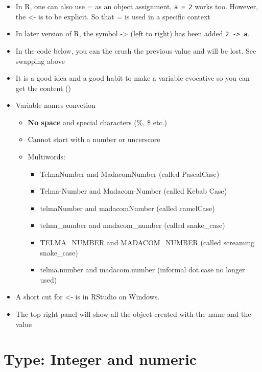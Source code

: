 \documentclass[
  letterpaper,
  DIV=11,
  numbers=noendperiod]{scrreprt}
\providecommand{\tightlist}{%
  \setlength{\itemsep}{0pt}\setlength{\parskip}{0pt}}
\begin{document}
\begin{itemize}
\tightlist
\item
  In R, one can also use = as an object assignment, \texttt{a\ =\ 2}
  works too. However, the \textless- is to be explicit. So that = is
  used in a specific context
\item
  In later version of R, the symbol -\textgreater{} (left to right) has
  been added \texttt{2\ -\textgreater{}\ a}.
\item
  In the code below, you can the crush the previous value and will be
  lost. See swapping above
\item
  It is a good idea and a good habit to make a variable evocative so you
  can get the content ()
\item
  Variable names convetion

  \begin{itemize}
  \tightlist
  \item
    \textbf{No space} and special characters (\%, \$ etc.)
  \item
    Cannot start with a number or uncerscore
  \item
    Multiwords:

    \begin{itemize}
    \tightlist
    \item
      TelmaNumber and MadacomNumber (called PascalCase)
    \item
      Telma-Number and Madacom-Number (called Kebab Case)
    \item
      telmaNumber and madacomNumber (called camelCase)
    \item
      telma\_number and madacom\_number (called snake\_case)
    \item
      TELMA\_NUMBER and MADACOM\_NUMBER (called screaming snake\_case)
    \item
      telma.number and madacom.number (informal dot.case no longer used)
    \end{itemize}
  \end{itemize}
\item
  A short cut for \textless- is in RStudio on Windows.
\item
  The top right panel will show all the object created with the name and
  the value
\end{itemize}

\chapter{Type: Integer and numeric}\label{sec-numeric}
\end{document}
